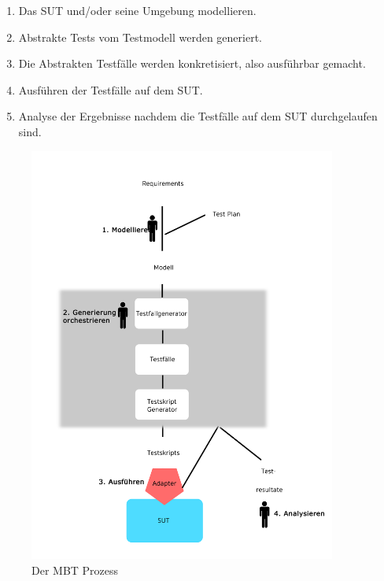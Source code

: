 \begin{enumerate}
\item Das SUT und/oder seine Umgebung modellieren.
\item Abstrakte Tests vom Testmodell werden generiert.
\item Die Abstrakten Testfälle werden konkretisiert, also ausführbar gemacht.
\item Ausführen der Testfälle auf dem SUT.
\item Analyse der Ergebnisse nachdem die Testfälle auf dem SUT durchgelaufen sind.
\end{enumerate}

\begin{figure}[h] 
  \centering
     \includegraphics[width=0.9\textwidth]{figures/MBT_Prozess.png}
  \caption{Der MBT Prozess \cite{utting_practical_2007}}
  \label{fig:mbt_prozess}
\end{figure}

